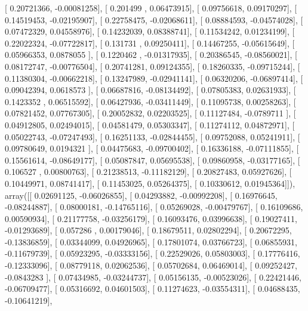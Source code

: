 \documentclass{article}
\begin{document}
       [ 0.20721366, -0.00081258],
       [ 0.201499  ,  0.06473915],
       [ 0.09756618,  0.09170297],
       [ 0.14519453, -0.02195907],
       [ 0.22758475, -0.02068611],
       [ 0.08884593, -0.04574028],
       [ 0.07472329,  0.04558976],
       [ 0.14232039,  0.08388741],
       [ 0.11534242,  0.01234199],
       [ 0.22022324, -0.07722817],
       [ 0.131731  ,  0.09250411],
       [ 0.14467255, -0.05615649],
       [ 0.05966353,  0.0878055 ],
       [ 0.1220462 , -0.01317935],
       [ 0.20386545, -0.08560021],
       [ 0.08172747, -0.00776504],
       [ 0.20741281,  0.09124355],
       [ 0.18260335, -0.09715244],
       [ 0.11380304, -0.00662218],
       [ 0.13247989, -0.02941141],
       [ 0.06320206, -0.06897414],
       [ 0.09042394,  0.0618573 ],
       [ 0.06687816, -0.08134492],
       [ 0.07805383,  0.02631933],
       [ 0.1423352 ,  0.06515592],
       [ 0.06427936, -0.03411449],
       [ 0.11095738,  0.00258263],
       [ 0.07821452,  0.07767305],
       [ 0.20052832,  0.02203525],
       [ 0.11127484, -0.0789711 ],
       [ 0.04912805,  0.02494015],
       [ 0.04581479,  0.05303347],
       [ 0.11274112,  0.04872971],
       [ 0.05022743, -0.07247493],
       [ 0.16251133, -0.02844455],
       [ 0.09752088,  0.05241911],
       [ 0.09780649,  0.0194321 ],
       [ 0.04475683, -0.09700402],
       [ 0.16336188, -0.07111855],
       [ 0.15561614, -0.08649177],
       [ 0.05087847,  0.05695538],
       [ 0.09860958, -0.03177165],
       [ 0.106527  ,  0.00800763],
       [ 0.21238513, -0.11182129],
       [ 0.20827483,  0.05927626],
       [ 0.10449971,  0.08741417],
       [ 0.11453025,  0.05264375],
       [ 0.10330612,  0.01945364]]), array([[ 0.02691125, -0.06026855],
       [ 0.04293882, -0.00992208],
       [ 0.16976645, -0.08244887],
       [ 0.08000181, -0.14765116],
       [ 0.05269028, -0.00479767],
       [ 0.16109686,  0.00590934],
       [ 0.21177758, -0.03256179],
       [ 0.16093476,  0.03996638],
       [ 0.19027411, -0.01293689],
       [ 0.057286  ,  0.00179046],
       [ 0.18679511,  0.02802294],
       [ 0.20672295, -0.13836859],
       [ 0.03344099,  0.04926965],
       [ 0.17801074,  0.03766723],
       [ 0.06855931, -0.11679739],
       [ 0.05923295, -0.03333156],
       [ 0.22529026,  0.05803003],
       [ 0.17776416, -0.12333096],
       [ 0.08779118,  0.02062536],
       [ 0.05702684,  0.06469014],
       [ 0.09252427, -0.0843283 ],
       [ 0.07434985, -0.03244737],
       [ 0.05156135, -0.00523026],
       [ 0.22421446, -0.06709477],
       [ 0.05316692,  0.04601503],
       [ 0.11274623, -0.03554311],
       [ 0.04688435, -0.10641219],
\end{document}
